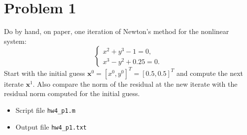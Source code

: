 \section{Problem 1}%
\label{sec:problem_1}
Do by hand, on paper, one iteration of Newton's method for the nonlinear system:
\begin{equation*}
  \begin{cases}
    x^{2} + y^{3} - 1 = 0, \\
    x^{3} - y^{2} + 0.25 = 0.
  \end{cases}
\end{equation*}
Start with the initial guess $\mathbf{x}^{0} = [x^{0}, y^{0}]^{T} = [0.5, 0.5]^{T}$ and compute the next iterate $\mathbf{x}^{1}$. Also compare the norm of the residual at the new iterate with the residual norm computed for the initial guess.
\begin{solution}
  \quad \vfill %
  \begin{itemize}
    \item
      Script file \verb|hw4_p1.m|
      
    \item
      Output file \verb|hw4_p1.txt|
      
  \end{itemize}

\end{solution}

